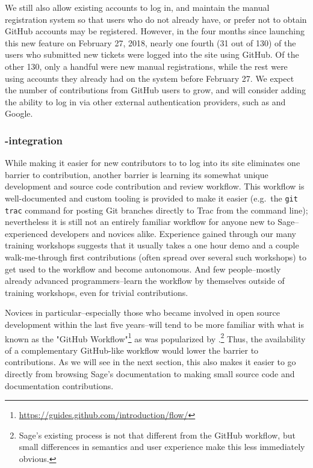 We still also allow existing accounts to log in, and maintain the manual
registration system so that users who do not already have, or prefer not to
obtain GitHub accounts may be registered.  However, in the four months since
launching this new feature on February 27, 2018, nearly one fourth (31 out of
130) of the users who submitted new tickets were logged into the site using
GitHub.  Of the other 130, only a handful were new manual registrations, while
the rest were using accounts they already had on the system before February 27.
We expect the number of contributions from GitHub users to grow, and will
consider adding the ability to log in via other external authentication
providers, such as \GitLab and Google.


\hypertarget{gitlab-trac-integration}{%
\subsubsection{\GitLab-\Trac integration}\label{gitlab-trac-integration}}

While making it easier for new contributors to \Sage to log into its \Trac site
eliminates one barrier to contribution, another barrier is learning its
somewhat unique development and source code contribution and review workflow.
This workflow is well-documented and custom tooling is provided to make it
easier (e.g.~the {\tt git trac} command for posting Git branches directly to
Trac from the command line); nevertheless it is still not an entirely familiar
workflow for anyone new to Sage--experienced developers and novices alike.
%
Experience gained through our many training workshops suggests that it usually
takes a one hour demo and a couple walk-me-through first contributions (often
spread over several such workshops) to get used to the workflow and become
autonomous. And few people--mostly already advanced programmers--learn the
workflow by themselves outside of training workshops, even for trivial
contributions.

Novices in particular--especially those who became involved in open source
development within the last five years--will tend to be more familiar with what
is known as the "GitHub
Workflow"\footnote{\url{https://guides.github.com/introduction/flow/}} as was
popularized by \GitHub.\footnote{Sage's existing process is not that different
from the GitHub workflow, but small differences in semantics and user
experience make this less immediately obvious.} Thus, the availability of a
complementary GitHub-like workflow would lower the barrier to contributions.
As we will see in the next section, this also makes it easier to go directly
from browsing Sage's documentation to making small source code and
documentation contributions.

